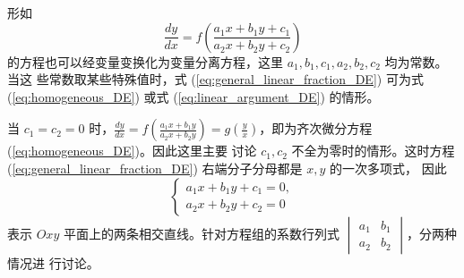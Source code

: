 \begin{definition}[可化为变量分离方程的类型二]\label{def:case3}
  形如  \begin{equation}
\frac{dy}{dx} = f\left(\frac{a_1x+b_1y+c_1}{a_2x+b_2y+c_2}\right) \label{eq:general_linear_fraction_DE}
\end{equation}
的方程也可以经变量变换化为变量分离方程，这里 $a_1,b_1,c_1,a_2,b_2,c_2$ 均为常数。当这
些常数取某些特殊值时，式 (\ref{eq:general_linear_fraction_DE}) 可为式 (\ref{eq:homogeneous_DE}) 或式 (\ref{eq:linear_argument_DE}) 的情形。
\end{definition}
\begin{solution}
    当 $c_1=c_2=0$ 时，$\frac{dy}{dx} = f\left(\frac{a_1x+b_1y}{a_2x+b_2y}\right) = g\left(\frac{y}{x}\right)$，即为齐次微分方程 (\ref{eq:homogeneous_DE})。因此这里主要
讨论 $c_1,c_2$ 不全为零时的情形。这时方程 (\ref{eq:general_linear_fraction_DE}) 右端分子分母都是 $x,y$ 的一次多项式，
因此
\begin{equation}
\begin{cases} a_1x+b_1y+c_1=0, \\ a_2x+b_2y+c_2=0 \end{cases} \label{eq:system_linear_equations}
\end{equation}
表示 $Oxy$ 平面上的两条相交直线。针对方程组的系数行列式 $\begin{vmatrix} a_1 & b_1 \\ a_2 & b_2 \end{vmatrix}$，分两种情况进
行讨论。


\end{solution}
